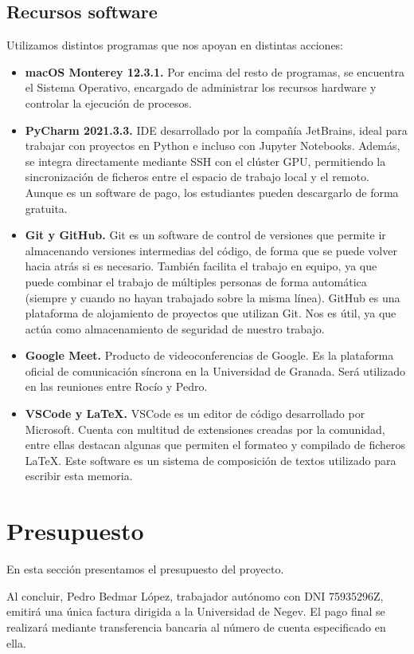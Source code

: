\subsection*{Recursos software}
\noindent Utilizamos distintos programas que nos apoyan en distintas acciones:
\begin{itemize}
    \item \textbf{macOS Monterey 12.3.1.} Por encima del resto de programas, se encuentra el Sistema Operativo, encargado de administrar los recursos hardware y controlar la ejecución de procesos.
    \item \textbf{PyCharm 2021.3.3.} IDE desarrollado por la compañía JetBrains, ideal para trabajar con proyectos en Python e incluso con Jupyter Notebooks. Además, se integra directamente mediante SSH con el clúster GPU, permitiendo la sincronización de ficheros entre el espacio de trabajo local y el remoto. Aunque es un software de pago, los estudiantes pueden descargarlo de forma gratuita.
    \item \textbf{Git y GitHub.} Git es un software de control de versiones que permite ir almacenando versiones intermedias del código, de forma que se puede volver hacia atrás si es necesario. También facilita el trabajo en equipo, ya que puede combinar el trabajo de múltiples personas de forma automática (siempre y cuando no hayan trabajado sobre la misma línea). GitHub es una plataforma de alojamiento de proyectos que utilizan Git. Nos es útil, ya que actúa como almacenamiento de seguridad de nuestro trabajo.
    \item \textbf{Google Meet.} Producto de videoconferencias de Google. Es la plataforma oficial de comunicación síncrona en la Universidad de Granada. Será utilizado en las reuniones entre Rocío y Pedro.
    \item \textbf{VSCode y \LaTeX.} VSCode es un editor de código desarrollado por Microsoft. Cuenta con multitud de extensiones creadas por la comunidad, entre ellas destacan algunas que permiten el formateo y compilado de ficheros \LaTeX. Este software es un sistema de composición de textos utilizado para escribir esta memoria.
\end{itemize}

\section*{Presupuesto}
En esta sección presentamos el presupuesto del proyecto.

Al concluir, Pedro Bedmar López, trabajador autónomo con DNI 75935296Z, emitirá una única factura dirigida a la Universidad de Negev. El pago final se realizará mediante transferencia bancaria al número de cuenta especificado en ella.

